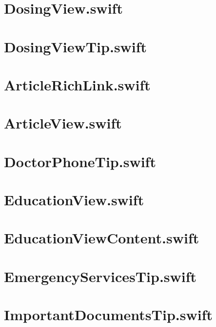 \section{DosingView.swift}


\section{DosingViewTip.swift}


\section{ArticleRichLink.swift}


\section{ArticleView.swift}


\section{DoctorPhoneTip.swift}


\section{EducationView.swift}


\section{EducationViewContent.swift}


\section{EmergencyServicesTip.swift}


\section{ImportantDocumentsTip.swift}


